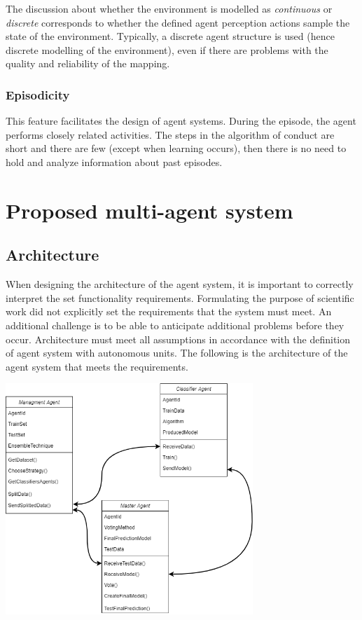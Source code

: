 The discussion about whether the environment is modelled as \textit{continuous} or \textit{discrete} corresponds to whether the defined agent perception actions sample the state of the environment. Typically, a discrete agent structure is used (hence discrete modelling of the environment), even if there are problems with the quality and reliability of the mapping.

\subsubsection{Episodicity}

This feature facilitates the design of agent systems. During the episode, the agent performs closely related activities. The steps in the algorithm of conduct are short and there are few (except when learning occurs), then there is no need to hold and analyze information about past episodes.

\newpage
\section{Proposed multi-agent system}

\subsection{Architecture}

When designing the architecture of the agent system, it is important to correctly interpret the set functionality requirements. Formulating the purpose of scientific work did not explicitly set the requirements that the system must meet. An additional challenge is to be able to anticipate additional problems before they occur. Architecture must meet all assumptions in accordance with the definition of agent system with autonomous units. The following is the architecture of the agent system that meets the requirements.


\begin{center}
	\includegraphics[width=0.70\textwidth, keepaspectratio]{diagrams/architecture-diag}
	\center
	\label{fig:architecture-diagram}
\end{center}



